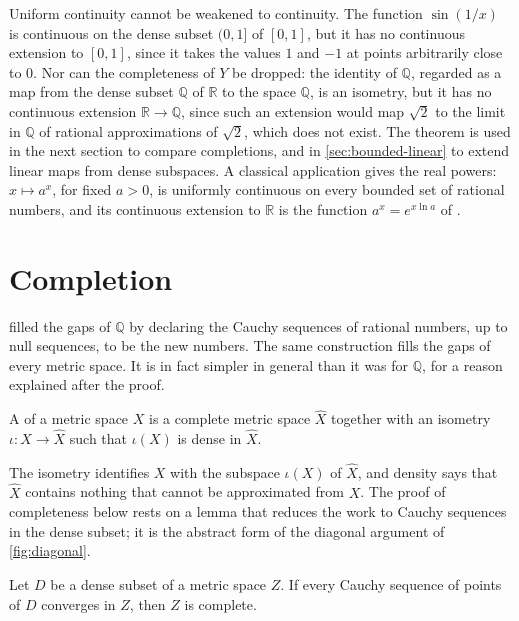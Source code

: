 Uniform continuity cannot be weakened to continuity. The function $\sin(1/x)$ is continuous on the dense subset $(0,1]$ of $[0,1]$, but it has no continuous extension to $[0,1]$, since it takes the values $1$ and $-1$ at points arbitrarily close to $0$. Nor can the completeness of $Y$ be dropped: the identity of $\mathbb Q$, regarded as a map from the dense subset $\mathbb Q$ of $\mathbb R$ to the space $\mathbb Q$, is an isometry, but it has no continuous extension $\mathbb R\to\mathbb Q$, since such an extension would map $\sqrt2$ to the limit in $\mathbb Q$ of rational approximations of $\sqrt2$, which does not exist. The theorem is used in the next section to compare completions, and in \cref{sec:bounded-linear} to extend linear maps from dense subspaces. A classical application gives the real powers: $x\mapsto a^x$, for fixed $a>0$, is uniformly continuous on every bounded set of rational numbers, and its continuous extension to $\mathbb R$ is the function $a^x=e^{x\ln a}$ of .

\section{Completion}
\label{sec:completion}

 filled the gaps of $\mathbb Q$ by declaring the Cauchy sequences of rational numbers, up to null sequences, to be the new numbers. The same construction fills the gaps of every metric space. It is in fact simpler in general than it was for $\mathbb Q$, for a reason explained after the proof.

\begin{definition}[Completion]
\label{def:completion}
A  of a metric space $X$ is a complete metric space $\hat X$ together with an isometry $\iota\colon X\to\hat X$ such that $\iota(X)$ is dense in $\hat X$.
\end{definition}

The isometry identifies $X$ with the subspace $\iota(X)$ of $\hat X$, and density says that $\hat X$ contains nothing that cannot be approximated from $X$. The proof of completeness below rests on a lemma that reduces the work to Cauchy sequences in the dense subset; it is the abstract form of the diagonal argument of \cref{fig:diagonal}.

\begin{lemma}
\label{lem:dense-cauchy}
Let $D$ be a dense subset of a metric space $Z$. If every Cauchy sequence of points of $D$ converges in $Z$, then $Z$ is complete.
\end{lemma}

